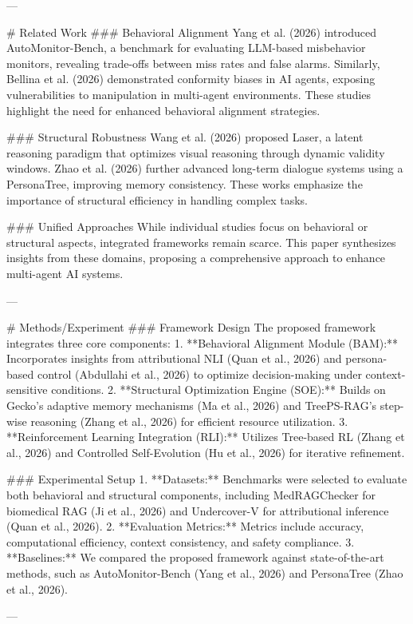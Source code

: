 ---

# Related Work  
### Behavioral Alignment  
Yang et al. (2026) introduced AutoMonitor-Bench, a benchmark for evaluating LLM-based misbehavior monitors, revealing trade-offs between miss rates and false alarms. Similarly, Bellina et al. (2026) demonstrated conformity biases in AI agents, exposing vulnerabilities to manipulation in multi-agent environments. These studies highlight the need for enhanced behavioral alignment strategies.

### Structural Robustness  
Wang et al. (2026) proposed Laser, a latent reasoning paradigm that optimizes visual reasoning through dynamic validity windows. Zhao et al. (2026) further advanced long-term dialogue systems using a PersonaTree, improving memory consistency. These works emphasize the importance of structural efficiency in handling complex tasks.

### Unified Approaches  
While individual studies focus on behavioral or structural aspects, integrated frameworks remain scarce. This paper synthesizes insights from these domains, proposing a comprehensive approach to enhance multi-agent AI systems.

---

# Methods/Experiment  
### Framework Design  
The proposed framework integrates three core components:  
1. **Behavioral Alignment Module (BAM):** Incorporates insights from attributional NLI (Quan et al., 2026) and persona-based control (Abdullahi et al., 2026) to optimize decision-making under context-sensitive conditions.  
2. **Structural Optimization Engine (SOE):** Builds on Gecko’s adaptive memory mechanisms (Ma et al., 2026) and TreePS-RAG's step-wise reasoning (Zhang et al., 2026) for efficient resource utilization.  
3. **Reinforcement Learning Integration (RLI):** Utilizes Tree-based RL (Zhang et al., 2026) and Controlled Self-Evolution (Hu et al., 2026) for iterative refinement.

### Experimental Setup  
1. **Datasets:** Benchmarks were selected to evaluate both behavioral and structural components, including MedRAGChecker for biomedical RAG (Ji et al., 2026) and Undercover-V for attributional inference (Quan et al., 2026).  
2. **Evaluation Metrics:** Metrics include accuracy, computational efficiency, context consistency, and safety compliance.  
3. **Baselines:** We compared the proposed framework against state-of-the-art methods, such as AutoMonitor-Bench (Yang et al., 2026) and PersonaTree (Zhao et al., 2026).

---

